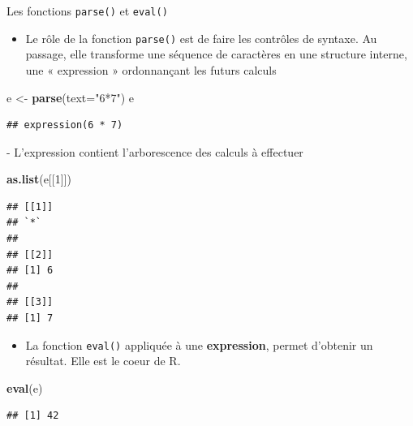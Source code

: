 \documentclass[
  ignorenonframetext,
]{beamer}
\newenvironment{Shaded}{\begin{snugshade}}{\end{snugshade}}
\newcommand{\AttributeTok}[1]{\textcolor[rgb]{0.13,0.29,0.53}{#1}}
\newcommand{\DecValTok}[1]{\textcolor[rgb]{0.00,0.00,0.81}{#1}}
\newcommand{\FunctionTok}[1]{\textcolor[rgb]{0.13,0.29,0.53}{\textbf{#1}}}
\newcommand{\NormalTok}[1]{#1}
\newcommand{\OtherTok}[1]{\textcolor[rgb]{0.56,0.35,0.01}{#1}}
\newcommand{\StringTok}[1]{\textcolor[rgb]{0.31,0.60,0.02}{#1}}
\providecommand{\tightlist}{%
  \setlength{\itemsep}{0pt}\setlength{\parskip}{0pt}}
\begin{document}
\begin{frame}[fragile]{Les fonctions \texttt{parse()} et
\texttt{eval()}}
\protect\hypertarget{les-fonctions-parse-et-eval}{}
\begin{itemize}
\tightlist
\item
  Le rôle de la fonction \texttt{parse()} est de faire les contrôles de
  syntaxe. Au passage, elle transforme une séquence de caractères en une
  structure interne, une « expression » ordonnançant les futurs calculs
\end{itemize}

\tiny

\begin{Shaded}
\begin{Highlighting}[]
\NormalTok{e }\OtherTok{\textless{}{-}} \FunctionTok{parse}\NormalTok{(}\AttributeTok{text=}\StringTok{"6*7"}\NormalTok{)}
\NormalTok{e}
\end{Highlighting}
\end{Shaded}

\begin{verbatim}
## expression(6 * 7)
\end{verbatim}

\normalsize - L'expression contient l'arborescence des calculs à
effectuer

\tiny

\begin{Shaded}
\begin{Highlighting}[]
\FunctionTok{as.list}\NormalTok{(e[[}\DecValTok{1}\NormalTok{]])}
\end{Highlighting}
\end{Shaded}

\begin{verbatim}
## [[1]]
## `*`
## 
## [[2]]
## [1] 6
## 
## [[3]]
## [1] 7
\end{verbatim}

\normalsize

\begin{itemize}
\tightlist
\item
  La fonction \texttt{eval()} appliquée à une \textbf{expression},
  permet d'obtenir un résultat. Elle est le coeur de R.
\end{itemize}

\tiny

\begin{Shaded}
\begin{Highlighting}[]
\FunctionTok{eval}\NormalTok{(e)}
\end{Highlighting}
\end{Shaded}

\begin{verbatim}
## [1] 42
\end{verbatim}

\normalsize
\end{frame}
\end{document}
